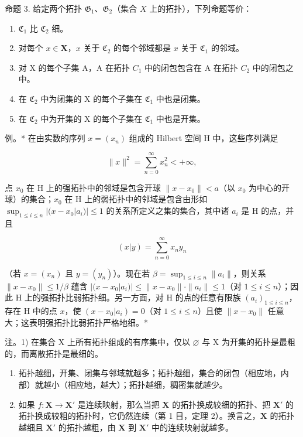 命题 3. 给定两个拓扑 \(\mathfrak{G}_1\)、\(\mathfrak{G}_2\)（集合 \(X\) 上的拓扑），下列命题等价：

\begin{enumerate}
\def\labelenumi{\alph{enumi})}
\item
  \(\mathfrak{C}_1\) 比 \(\mathfrak{C}_2\) 细。
\item
  对每个 \(x \in \mathbf{X}\)，\(x\) 关于 \(\mathfrak{C}_2\) 的每个邻域都是 \(x\) 关于 \(\mathfrak{C}_1\) 的邻域。
\item
  对 X 的每个子集 A，A 在拓扑 \(C_{1}\) 中的闭包包含在 A 在拓扑 \(C_{2}\) 中的闭包之中。
\item
  在 \(\mathfrak{C}_{2}\) 中为闭集的 X 的每个子集在 \(\mathfrak{C}_{1}\) 中也是闭集。
\item
  在 \(\mathfrak{C}_{2}\) 中为开集的 X 的每个子集在 \(\mathfrak{C}_{1}\) 中也是开集。
\end{enumerate}

例。* 在由实数的序列 \(x = (x_n)\) 组成的 Hilbert 空间 H 中，这些序列满足

\[
\| x \| ^ {2} = \sum_ {n = 0} ^ {\infty} x _ {n} ^ {2} <   + \infty ,
\]

点 \(x_0\) 在 H 上的强拓扑中的邻域是包含开球 \(\|x - x_0\| < a\)（以 \(x_0\) 为中心的开球）的集合；\(x_0\) 在 H 上的弱拓扑中的邻域是包含由形如 \(\sup_{1 \leqslant i \leqslant n} |(x - x_0|a_i)| \leqslant 1\) 的关系所定义之集的集合，其中诸 \(a_i\) 是 H 的点，并且

\[
(x | y) = \sum_ {n = 0} ^ {\infty} x _ {n} y _ {n}
\]

（若 \(x = (x_n)\) 且 \(y = (y_n)\)）。现在若 \(\beta = \sup_{1 \leqslant i \leqslant n} \|a_i\|\)，则关系 \(\|x - x_0\| \leqslant 1/\beta\) 蕴含 \(|(x - x_0|a_i)| \leqslant \|x - x_0\| \cdot \|a_i\| \leqslant 1\)（对 \(1 \leqslant i \leqslant n\)）；因此 H 上的强拓扑比弱拓扑细。另一方面，对 H 的点的任意有限族 \((a_i)_{1 \leqslant i \leqslant n}\)，存在 H 中的点 \(x\)，使 \((x - x_0|a_i) = 0\)（对 \(1 \leqslant i \leqslant n\)）且使 \(\|x - x_0\|\) 任意大；这表明强拓扑比弱拓扑严格地细。*

注。1) 在集合 X 上所有拓扑组成的有序集中，仅以 \(\varnothing\) 与 X 为开集的拓扑是最粗的，而离散拓扑是最细的。

\begin{enumerate}
\def\labelenumi{\arabic{enumi})}
\setcounter{enumi}{1}
\item
  拓扑越细，开集、闭集与邻域就越多；拓扑越细，集合的闭包（相应地，内部）就越小（相应地，越大）；拓扑越细，稠密集就越少。
\item
  如果 \(f: \mathbf{X} \to \mathbf{X}'\) 是连续映射，那么当把 \(\mathbf{X}\) 的拓扑换成较细的拓扑、把 \(\mathbf{X}'\) 的拓扑换成较粗的拓扑时，它仍然连续（第 1 目，定理 2）。换言之，\(\mathbf{X}\) 的拓扑越细且 \(\mathbf{X}'\) 的拓扑越粗，由 \(\mathbf{X}\) 到 \(\mathbf{X}'\) 中的连续映射就越多。
\end{enumerate}

